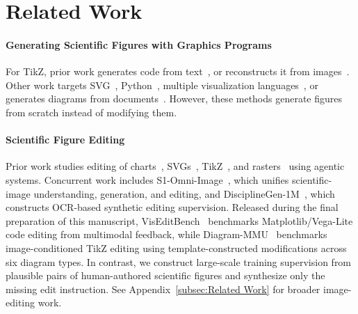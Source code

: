 \section{Related Work}
\label{sec:Related Work}

\paragraph{Generating Scientific Figures with Graphics Programs}
For TikZ, prior work generates code from text~\citep{belouadi2024automatikz, belouadi2025tikzero, greisinger2026tikzilla}, or reconstructs it from images~\citep{belouadi2024detikzify, zeng2026davinci, lin2026scientificgraphicsprogramsynthesis}. Other work targets SVG~\citep{rodriguez2025cvpr-starvector,Wu2024Chat2SVGVG,zou-etal-2024-vgbench}, Python~\citep{ni-etal-2025-viscoder,yang-etal-2024-matplotagent}, multiple visualization languages~\citep{zhang2025scimage,ni2026viscoder}, or generates diagrams from documents~\citep{zhu2026paperbanana, Guan2026GENFIG1VS, mondal-etal-2024-scidoc2diagrammer}. However, these methods generate figures from scratch instead of modifying them.

\paragraph{Scientific Figure Editing}
Prior work studies editing of charts~\citep{zhao-etal-2025-chartedit,li2026charts}, SVGs~\citep{kuchar2025vectoreditsdatasetbenchmarkinstructionbased, lin2026autofigureeditgeneratingeditablescientific}, TikZ~\citep{Wei_2025_CVPR}, and rasters~\citep{zhao2026craftermultiagentharnesseditable} using agentic systems. Concurrent work includes S1-Omni-Image~\citep{li2026s1omniimageunifiedmodelscientific}, which unifies scientific-image understanding, generation, and editing, and DisciplineGen-1M~\citep{wang2026disciplinegen1mlargescaledatasetmultidisciplinary}, which constructs OCR-based synthetic editing supervision. Released during the final preparation of this manuscript, VisEditBench~\citep{rahman2026viseditbenchvisionlanguagemodelsedit} benchmarks Matplotlib/Vega-Lite code editing from multimodal feedback, while Diagram-MMU~\citep{bo2026diagrammmumultimodalbenchmarkscientific} benchmarks image-conditioned TikZ editing using template-constructed modifications across six diagram types. In contrast, we construct large-scale training supervision from plausible pairs of human-authored scientific figures and synthesize only the missing edit instruction. See Appendix~\ref{subsec:Related Work} for broader image-editing work.

